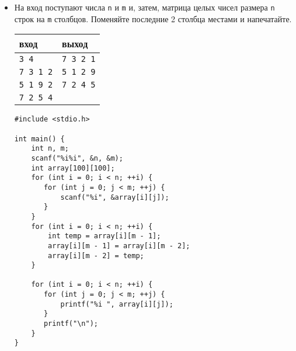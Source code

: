 \documentclass{article}
\begin{document}
\begin{itemize}
\begin{lstlisting}[backgroundcolor = \color{solcolor}]
#include <stdio.h>
#include <limits.h>
int main() {
    int n, m;
    scanf("%i%i", &n, &m);
    
    int max = INT_MIN;
    int imax = 0;
    int jmax = 0;
    for (int i = 0; i < n; ++i) {
        for (int j = 0; j < m; ++j) {
            int num;
            scanf("%i", &num);
            if (num > max) {
                max = num;
                imax = i;
                jmax = j;
            }
        }
    }
    
    printf("%i %i %i\n", max, imax, jmax);
}
\end{lstlisting}

\newpage
\item На вход поступают числа \texttt{n} и \texttt{m} и, затем, матрица целых чисел размера \texttt{n} строк на \texttt{m} столбцов. Поменяйте последние 2 столбца местами и напечатайте.
\begin{center}
\begin{tabular}{ l | l }
 вход & выход \\ \hline
 \texttt{3 4} &        \texttt{7 3 2 1}  \\ 
 \texttt{7 3 1 2} &    \texttt{5 1 2 9}\\ 
 \texttt{5 1 9 2} &    \texttt{7 2 4 5}\\ 
 \texttt{7 2 5 4} &  \\ 
\end{tabular}
\end{center}

\begin{lstlisting}[backgroundcolor = \color{solcolor}]
#include <stdio.h>

int main() {
    int n, m;
    scanf("%i%i", &n, &m);
    int array[100][100];
    for (int i = 0; i < n; ++i) {
       for (int j = 0; j < m; ++j) {
           scanf("%i", &array[i][j]);
       }
    }
    for (int i = 0; i < n; ++i) {
        int temp = array[i][m - 1];
        array[i][m - 1] = array[i][m - 2];
        array[i][m - 2] = temp;
    }
    
    for (int i = 0; i < n; ++i) {
       for (int j = 0; j < m; ++j) {
           printf("%i ", array[i][j]);
       }
       printf("\n");
    }
}
\end{lstlisting}
\end{itemize}
\end{document}
